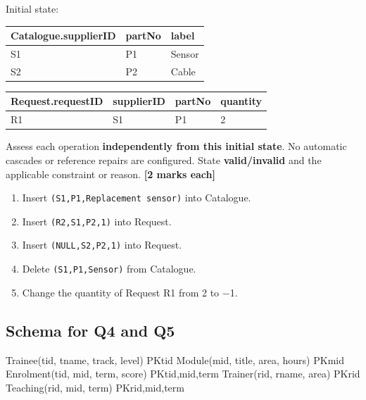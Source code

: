 Initial state:

\begin{longtable}[]{@{}lll@{}}
\toprule\noalign{}
Catalogue.supplierID & partNo & label \\
\midrule\noalign{}
\endhead
\bottomrule\noalign{}
\endlastfoot
S1 & P1 & Sensor \\
S2 & P2 & Cable \\
\end{longtable}

\begin{longtable}[]{@{}llll@{}}
\toprule\noalign{}
Request.requestID & supplierID & partNo & quantity \\
\midrule\noalign{}
\endhead
\bottomrule\noalign{}
\endlastfoot
R1 & S1 & P1 & 2 \\
\end{longtable}

Assess each operation \textbf{independently from this initial state}. No automatic cascades or reference repairs are configured. State \textbf{valid/invalid} and the applicable constraint or reason. \textbf{{[}2 marks each{]}}

\begin{enumerate}
\def\labelenumi{\arabic{enumi}.}
\tightlist
\item
  Insert \texttt{(S1,P1,\textquotesingle{}Replacement\ sensor\textquotesingle{})} into Catalogue.
\item
  Insert \texttt{(\allowbreak{}R2,\allowbreak{}S1,\allowbreak{}P2,\allowbreak{}1)\allowbreak{}} into Request.
\item
  Insert \texttt{(\allowbreak{}NULL,\allowbreak{}S2,\allowbreak{}P2,\allowbreak{}1)\allowbreak{}} into Request.
\item
  Delete \texttt{(S1,P1,\textquotesingle{}Sensor\textquotesingle{})} from Catalogue.
\item
  Change the quantity of Request R1 from 2 to −1.
\end{enumerate}

\subsection{Schema for Q4 and Q5}\label{practice_paper_1-schema-for-q4-and-q5}

\begin{StudyCode}
Trainee(tid, tname, track, level)       PK{tid}
Module(mid, title, area, hours)        PK{mid}
Enrolment(tid, mid, term, score)       PK{tid,mid,term}
Trainer(rid, rname, area)              PK{rid}
Teaching(rid, mid, term)               PK{rid,mid,term}
\end{StudyCode}

